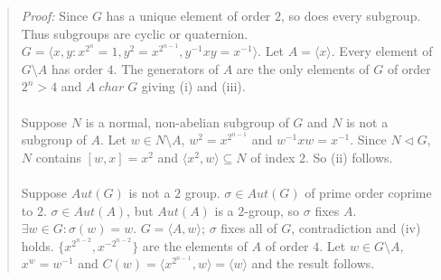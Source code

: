 \begin{quote}
\emph{Proof:}
Since $G$ has a unique element of order $2$, so does every subgroup.
Thus subgroups are cyclic or quaternion.
$G = \langle x, y: x^{2^n}= 1, y^2= x^{2^{n-1}}, y^{-1} x y = x^{-1} \rangle$.  Let $A = \langle x \rangle$.
Every element of $G \setminus A$ has order $4$.  The generators of $A$ are the only elements of $G$
of order $2^n > 4$ and $A \; char \; G$ giving (i) and (iii).
\\
\\
Suppose $N$ is a normal, non-abelian subgroup
of $G$ and $N$ is not a subgroup of $A$.  Let $w \in N \setminus A$, $w^2 = x^{2^{n-1}}$ and
$w^{-1} x w = x^{-1}$.  Since $N \lhd G$, $N$ contains $[w,x]=x^2$ and $\langle x^2, w \rangle \subseteq N$
of index $2$.  So (ii) follows.
\\
\\
Suppose $Aut(G)$ is not a $2$ group. $\sigma \in Aut(G)$ of prime order coprime to $2$. $\sigma \in Aut(A)$,
but $Aut(A)$ is a $2$-group, so $\sigma$ fixes $A$.  $\exists w \in G: \sigma(w) =w$.
$G = \langle A, w \rangle$; $\sigma$ fixes all of $G$, contradiction and (iv) holds.
$\{ x^{2^{n-2}},x^{-2^{n-2}} \} $ are the elements of $A$ of order $4$.  Let $w \in G \setminus A$,
$x^w = w^{-1}$ and $C(w)= \langle x^{2^{n-1}}, w \rangle = \langle w \rangle$ and the result follows.
\end{quote}

